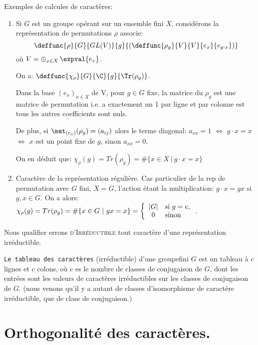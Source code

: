 \begin{examplebox}
	Exemples de calcules de caractères:
\begin{enumerate}
	\item Si $G$ est un groupe opérant sur un ensemble fini $X$, considérons la représentation de permutations $\rho$ associe:
	$$\deffunc{\rho}{G}{GL(V)}{g}{\left( \deffunc{\rho_g}{V}{V}{e_x}{e_{g\cdot x}} \right)}$$
	où $V=\mathop{\oplus}_{\substack{x\in X}}\expval{e_x}$.
	
	On a: $\deffunc{\chi_\rho}{G}{\C}{g}{\Tr(\rho_g)}$.

	Dans la base $(e_x)_{x\in X}$ de V, pour $g\in G$ fixe, la matrice du $\rho_g$ est une matrice de permutation i.e. a exactement un 1 par ligne et par colonne est tous les autres coefficients sont nuls.
	
	De plus, si $\mat_{(e_x)}(\rho_g)=(a_{ij})$ alors le terme diagonal: $a_{xx}=1$  $\Leftrightarrow$   $g\cdot x=x$  $\Leftrightarrow$  $x$ est un point fixe de $g$, sinon $a_{xx}=0$.
	
	On en déduit que: $\chi_\rho(g)=Tr(\rho_g)=\#\{x\in X\ |\ g\cdot x= x\}$
	\item Caractère de la représentation régulière.
	Cas particulier de la rep de permutation avec $G$ fini, $X=G$, l'action étant la multiplication: $g\cdot x=gx$ si $g,x\in G$.
	On a alors: $\chi_\rho(g)=Tr(\rho_g)=\#\{x\in G\ |\ gx=x\}=\left\{\begin{array}{cl}|G|&\mbox{si }g=e\mbox,\\0& \mbox{sinon }\end{array}\right.$.
\end{enumerate}
\end{examplebox}


\begin{definition}
	Nous qualifier errons \textsc{d’Irréductible} tout caractère d’une représentation irréductible.
\end{definition}
	
	\texttt{Le tableau des caractères} (irréductible) d'une groupefini $G$ est un tableau  à $c$ lignes et $c$ colons, où $c$ es le nombre de classes de conjugaison de $G$, dont les entrées sont les valeurs de caractères irréductibles sur les classes de conjugaison de $G$. (nous venons qu'il y a autant de classes d'isomorphisme de caractère irréductible, que de class de conjugaison.) 
	
\section{Orthogonalité des caractères.} %

